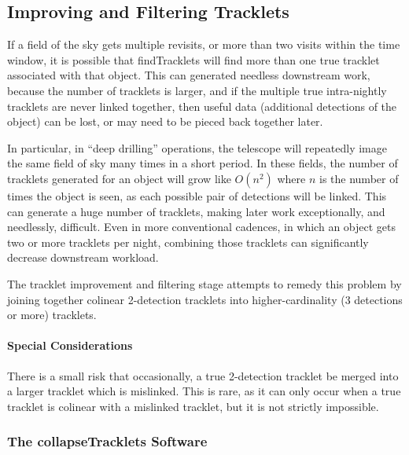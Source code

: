 

\subsection{Improving and Filtering Tracklets} \label{collapseTracklets}
If a field of the sky gets multiple revisits, or more than two visits
within the time window, it is possible that findTracklets will find
more than one true tracklet associated with that object.  This can
generated needless downstream work, because the number of tracklets is
larger, and if the multiple true intra-nightly tracklets are never
linked together, then useful data (additional detections of the
object) can be lost, or may need to be pieced back together later.

In particular, in ``deep drilling'' operations, the telescope will
repeatedly image the same field of sky many times in a short period.
In these fields, the number of tracklets generated for an object will
grow like $O(n^2)$ where $n$ is the number of times the object is
seen, as each possible pair of detections will be linked.  This can
generate a huge number of tracklets, making later work exceptionally,
and needlessly, difficult.  Even in more conventional cadences, in
which an object gets two or more tracklets per night, combining those
tracklets can significantly decrease downstream workload.

The tracklet improvement and filtering stage attempts to remedy this
problem by joining together colinear 2-detection tracklets into
higher-cardinality (3 detections or more) tracklets.


\paragraph{Special Considerations}
There is a small risk that occasionally, a true 2-detection tracklet
be merged into a larger tracklet which is mislinked.  This is rare, as
it can only occur when a true tracklet is colinear with a mislinked
tracklet, but it is not strictly impossible.



\subsubsection{The collapseTracklets Software} 

